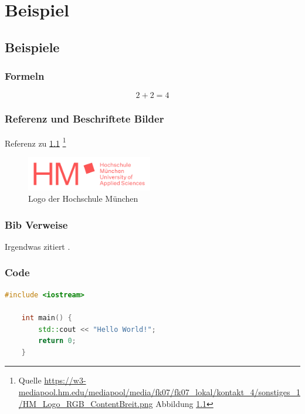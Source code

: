 \chapter{Beispiel}\label{chapter:Beispiel}

\section{Beispiele}


\subsection{Formeln}

\begin{equation}
	2 + 2 = 4
\end{equation} 


\subsection{Referenz und Beschriftete Bilder}
Referenz zu \ref{fig:hmLogo} \footnote{Quelle \url{https://w3-mediapool.hm.edu/mediapool/media/fk07/fk07_lokal/kontakt_4/sonstiges_1/HM_Logo_RGB_ContentBreit.png} Abbildung \ref{fig:hmLogo}}

\begin{figure}[H]
	\centering
	\includegraphics[height=15mm]{image/HM/logo_text.png}
	\caption{Logo der Hochschule München}
	\label{fig:hmLogo}
\end{figure}  


\subsection{Bib Verweise}
Irgendwas zitiert \cite{BibTeX}.


\subsection{Code}
\begin{lstlisting}[language=C++, caption=C++ Hello World!, label=lst:test]
	#include <iostream>
	
	int main() {
		std::cout << "Hello World!";
		return 0;
	}
\end{lstlisting}

\newpage